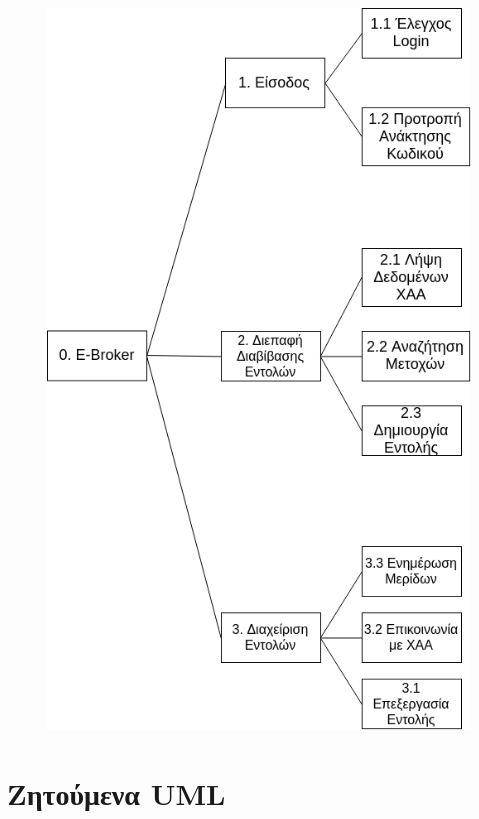 \documentclass{article}
\begin{document}
\begin{figure}[!h]
	\includegraphics[width=12cm]{../Structured_Analysis/Decomposition_tree.png}
\end{figure}


\newpage
\section{Ζητούμενα UML}
\end{document}
